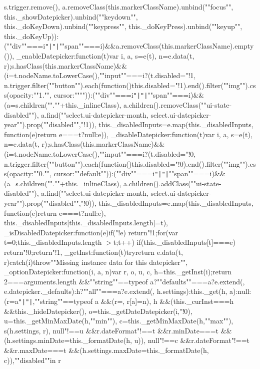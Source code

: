 s.\+trigger.\+remove(), a.\+remove\+Class(this.\+marker\+Class\+Name).\+unbind(""focus"", this.\+\_\+show\+Datepicker).\+unbind(""keydown"", this.\+\_\+do\+Key\+Down).\+unbind(""keypress"", this.\+\_\+do\+Key\+Press).\+unbind(""keyup"", this.\+\_\+do\+Key\+Up))\+:(""div""===i\texttt{"|}\texttt{"|}""span""===i)\&\&a.\+remove\+Class(this.\+marker\+Class\+Name).\+empty())\rcurly{}, \+\_\+enable\+Datepicker\+:function(t)\lcurly{}var i, a, s=e(t), n=e.\+data(t, r);s.\+has\+Class(this.\+marker\+Class\+Name)\&\&(i=t.\+node\+Name.\+to\+Lower\+Case(),""input""===i?(t.\+disabled="!1, n.\+trigger.\+filter(""button"").\+each(function()\lcurly{}this.\+disabled="!1\rcurly{}).\+end().\+filter(""img"").\+css(\lcurly{}opacity\+:""1."", cursor\+:""""\rcurly{}))\+:(""div""===i\texttt{"|}\texttt{"|}""span""===i)\&\&(a=s.\+children("".""+this.\+\_\+inline\+Class), a.\+children().\+remove\+Class(""ui-\/state-\/disabled""), a.\+find(""select.\+ui-\/datepicker-\/month, select.\+ui-\/datepicker-\/year"").\+prop(""disabled"","!1)), this.\+\_\+disabled\+Inputs=e.\+map(this.\+\_\+disabled\+Inputs, function(e)\lcurly{}return e===t?null\+:e\rcurly{}))\rcurly{}, \+\_\+disable\+Datepicker\+:function(t)\lcurly{}var i, a, s=e(t), n=e.\+data(t, r);s.\+has\+Class(this.\+marker\+Class\+Name)\&\&(i=t.\+node\+Name.\+to\+Lower\+Case(),""input""===i?(t.\+disabled="!0, n.\+trigger.\+filter(""button"").\+each(function()\lcurly{}this.\+disabled="!0\rcurly{}).\+end().\+filter(""img"").\+css(\lcurly{}opacity\+:""0."", cursor\+:""default""\rcurly{}))\+:(""div""===i\texttt{"|}\texttt{"|}""span""===i)\&\&(a=s.\+children("".""+this.\+\_\+inline\+Class), a.\+children().\+add\+Class(""ui-\/state-\/disabled""), a.\+find(""select.\+ui-\/datepicker-\/month, select.\+ui-\/datepicker-\/year"").\+prop(""disabled"","!0)), this.\+\_\+disabled\+Inputs=e.\+map(this.\+\_\+disabled\+Inputs, function(e)\lcurly{}return e===t?null\+:e\rcurly{}), this.\+\_\+disabled\+Inputs[this.\+\_\+disabled\+Inputs.\+length]=t)\rcurly{}, \+\_\+is\+Disabled\+Datepicker\+:function(e)\lcurly{}if("!e) return"!1;for(var t=0;this.\+\_\+disabled\+Inputs.\+length $>$t;t++) if(this.\+\_\+disabled\+Inputs[t]===e) return"!0;return"!1\rcurly{}, \+\_\+get\+Inst\+:function(t)\lcurly{}try\lcurly{}return e.\+data(t, r)\rcurly{}catch(i)\lcurly{}throw""Missing instance data for this datepicker""\rcurly{}\rcurly{}, \+\_\+option\+Datepicker\+:function(i, a, n)\lcurly{}var r, o, u, c, h=this.\+\_\+get\+Inst(i);return 2===arguments.\+length \&\&""string""==typeof a?""defaults""===a?e.\+extend(\lcurly{}\rcurly{}, e.\+datepicker.\+\_\+defaults)\+:h?""all""===a?e.\+extend(\lcurly{}\rcurly{}, h.\+settings)\+:this.\+\_\+get(h, a)\+:null\+:(r=a\texttt{"|}\texttt{"|}\lcurly{}\rcurly{},""string""==typeof a \&\&(r=\lcurly{}\rcurly{}, r[a]=n), h \&\&(this.\+\_\+cur\+Inst===h \&\&this.\+\_\+hide\+Datepicker(), o=this.\+\_\+get\+Date\+Datepicker(i,"!0), u=this.\+\_\+get\+Min\+Max\+Date(h,""min""), c=this.\+\_\+get\+Min\+Max\+Date(h,""max""), s(h.\+settings, r), null"!==u \&\&r.\+date\+Format"!==t \&\&r.\+min\+Date===t \&\&(h.\+settings.\+min\+Date=this.\+\_\+format\+Date(h, u)), null"!==c \&\&r.\+date\+Format"!==t \&\&r.\+max\+Date===t \&\&(h.\+settings.\+max\+Date=this.\+\_\+format\+Date(h, c)),""disabled""in r 